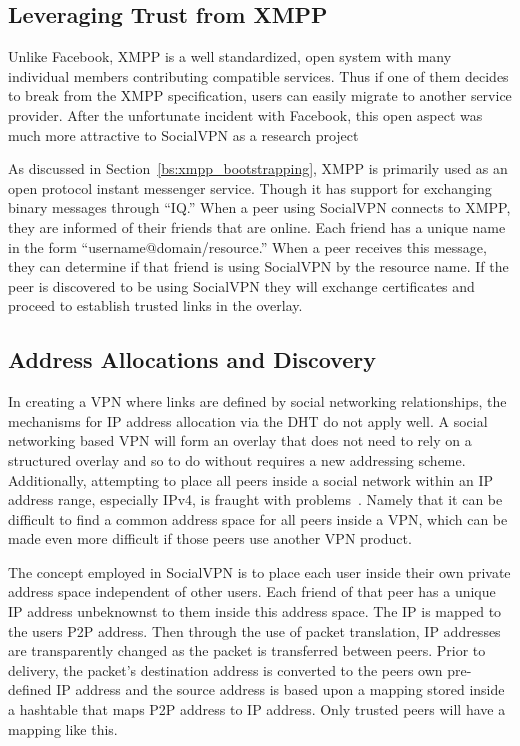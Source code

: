 \subsection{Leveraging Trust from XMPP}

Unlike Facebook, XMPP is a well standardized, open system with many individual
members contributing compatible services.  Thus if one of them decides to break
from the XMPP specification, users can easily migrate to another service
provider.  After the unfortunate incident with Facebook, this open aspect was
much more attractive to SocialVPN as a research project

As discussed in Section~\ref{bs:xmpp_bootstrapping}, XMPP is primarily used as
an open protocol instant messenger service.  Though it has support for
exchanging binary messages through ``IQ.'' When a peer using SocialVPN connects
to XMPP, they are informed of their friends that are online.  Each friend has a
unique name in the form ``username@domain/resource.'' When a peer receives this
message, they can determine if that friend is using SocialVPN by the resource
name.  If the peer is discovered to be using SocialVPN they will exchange
certificates and proceed to establish trusted links in the overlay. 

\subsection{Address Allocations and Discovery}

In creating a VPN where links are defined by social networking relationships,
the mechanisms for IP address allocation via the DHT do not apply well.  A
social networking based VPN will form an overlay that does not need to rely on
a structured overlay and so to do without requires a new addressing scheme.
Additionally, attempting to place all peers inside a social network within an
IP address range, especially IPv4, is fraught with problems~\cite{rfc5684}.
Namely that it can be difficult to find a common address space for all peers
inside a VPN, which can be made even more difficult if those peers use another
VPN product.

The concept employed in SocialVPN is to place each user inside their own
private address space independent of other users.  Each friend of that peer has
a unique IP address unbeknownst to them inside this address space.  The IP is
mapped to the users P2P address.  Then through the use of packet translation,
IP addresses are transparently changed as the packet is transferred between
peers.  Prior to delivery, the packet's destination address is converted to the
peers own pre-defined IP address and the source address is based upon a mapping
stored inside a hashtable that maps P2P address to IP address.  Only trusted
peers will have a mapping like this.

